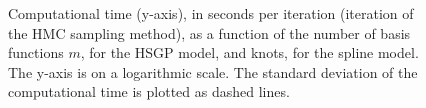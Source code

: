 \documentclass[onecolumn,a4paper,11pt]{article}
\begin{document}
\begin{figure}
\centering
{}
\caption{Computational time (y-axis), in seconds per iteration (iteration of the HMC sampling method), as a function of the number of basis functions $m$, for the HSGP model, and knots, for the spline model. The y-axis is on a logarithmic scale. The standard deviation of the computational time is plotted as dashed lines.}
  \label{ch5_fig11_time_exI}
\end{figure}
\end{document}
